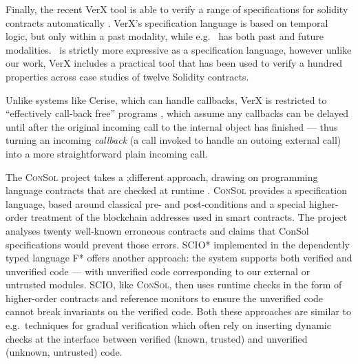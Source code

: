 



Finally, the recent VerX tool is able to verify a range of
specifications for solidity contracts automatically \cite{VerX}.
VerX's specification language is based on
temporal logic, 
but only within a past modality, while e.g.\ \citet{OOPSLA22} has both past
and future modalities.
\Chainmail\ is strictly more expressive as a
specification language,
%
however unlike
%
our work, VerX includes a practical tool that has
been used to verify   a hundred properties across case studies of
twelve Solidity contracts.
 

Unlike systems like Cerise, which can handle callbacks, VerX
is restricted to ``effectively call-back free'' programs
\cite{Grossman,Albert,relaxed-callbacks-ToDES}, which assume any callbacks can be delayed until after the
original incoming call to the internal object has finished 
--- thus turning an incoming \textit{callback} (a call invoked 
to handle an outoing external call) into a more straightforward plain
incoming call. 


The \textsc{ConSol} project \cite{consolidating-pldi2024} takes a
;different approach, drawing on programming language contracts that are
checked at runtime \cite{FinFel01}. \textsc{ConSol} provides a
specification language, based around classical pre- and post-conditions and
a special higher-order treatment of the blockchain addresses used in
smart contracts. The project analyses twenty well-known erroneous
contracts and claims that ConSol specifications would prevent those
errors.
SCIO* \cite{secure-io-fstar-popl2024} implemented in the dependently
typed language F* offers another approach: the system supports both
verified and unverified code --- with unverified code 
corresponding to our external or untrusted modules.  SCIO,
like \textsc{ConSol}, then uses runtime checks in the form of
higher-order contracts and reference monitors to ensure the unverified
code cannot break invariants on the verified code. Both these
approaches are similar to e.g.\  techniques for gradual
verification \cite{gradual-verification-popl2024,Cok2022} which often
rely on inserting dynamic checks at the interface between verified
(known, trusted) and unverified (unknown, untrusted) code.



